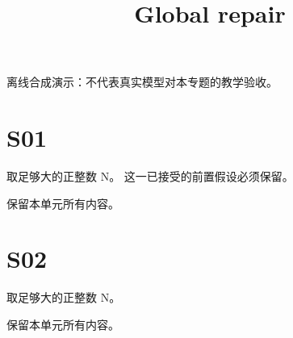 \documentclass[UTF8,fontset=fandol,11pt]{ctexart}
\title{Global repair}
\date{}
\begin{document}
\maketitle
\par\noindent 离线合成演示：不代表真实模型对本专题的教学验收。\par
\section{S01}\label{sec:S01}
取足够大的正整数 N。 这一已接受的前置假设必须保留。\par
保留本单元所有内容。\par
\section{S02}\label{sec:S02}
取足够大的正整数 N。\par
保留本单元所有内容。\par
\end{document}
